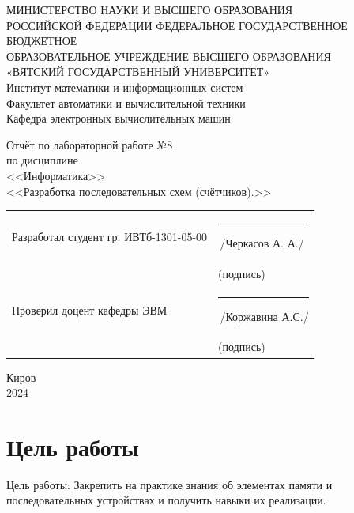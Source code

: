 \documentclass[oneside,a4paper,14pt]{extarticle}
\begin{document}
\newpage
\thispagestyle{empty}
\begin{center}
	МИНИСТЕРСТВО НАУКИ И ВЫСШЕГО ОБРАЗОВАНИЯ\\
	РОССИЙСКОЙ ФЕДЕРАЦИИ
	ФЕДЕРАЛЬНОЕ ГОСУДАРСТВЕННОЕ БЮДЖЕТНОЕ\\
	ОБРАЗОВАТЕЛЬНОЕ
	УЧРЕЖДЕНИЕ ВЫСШЕГО ОБРАЗОВАНИЯ\\
	«ВЯТСКИЙ ГОСУДАРСТВЕННЫЙ УНИВЕРСИТЕТ»\\
	Институт математики и информационных систем\\
	Факультет автоматики и вычислительной техники\\
	Кафедра электронных вычислительных машин
\end{center}
\vspace{20mm}

\begin{center}
	Отчёт по лабораторной работе №8\\
	по дисциплине\\
	<<Информатика>>\\
	<<Разработка последовательных схем (счётчиков).>>\\
\end{center}
\vspace{40mm}
\noindent
\begin{tabular}{ll}
	Разработал студент гр. ИВТб-1301-05-00 & \rule[-1mm]{30mm}{0.10mm}\,/Черкасов А. А./ \\
	                                       & \hspace{8mm}\footnotesize(подпись)          \\

	Проверил доцент кафедры ЭВМ            & \rule[-1mm]{30mm}{0.10mm}\,/Коржавина А.С./ \\
	                                       & \hspace{8mm}\footnotesize(подпись)          \\
\end{tabular}

\vfill
\begin{center}
	Киров\\
	2024
\end{center}

\newpage\thispagestyle{plain}
\section*{Цель работы}
Цель работы: Закрепить на практике знания об элементах памяти и последовательных устройствах и получить навыки их реализации.\\
\end{document}
